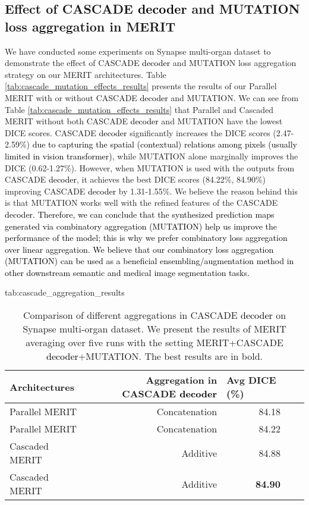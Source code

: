 \documentclass{midl}
\begin{document}
\subsection{Effect of CASCADE \textcolor{black}{decoder} and MUTATION loss aggregation in MERIT}
\label{assec:effect_cascade_mutation}
We have conducted some experiments on Synapse multi-organ dataset to demonstrate the effect of CASCADE \textcolor{black}{decoder} and MUTATION loss aggregation strategy on our MERIT architectures. Table \ref{tab:cascade_mutation_effects_results} presents the results of our Parallel MERIT with or without CASCADE \textcolor{black}{decoder} and MUTATION. We can see from Table \ref{tab:cascade_mutation_effects_results} that Parallel and Cascaded MERIT without both CASCADE \textcolor{black}{decoder} and MUTATION have the lowest DICE scores. CASCADE \textcolor{black}{decoder} significantly increases the DICE scores (2.47-2.59\%) \textcolor{black}{due to capturing the spatial (contextual) relations among pixels (usually limited in vision transformer)}, while MUTATION alone marginally improves the DICE (0.62-1.27\%). However, when MUTATION is used with the outputs from CASCADE \textcolor{black}{decoder}, it achieves the best DICE scores (84.22\%, 84.90\%) improving CASCADE \textcolor{black}{decoder} by 1.31-1.55\%. We believe the reason behind this is that MUTATION works well with the refined features of the CASCADE \textcolor{black}{decoder}. \textcolor{black}{Therefore, we can conclude that the synthesized prediction maps generated via combinatory aggregation (MUTATION) help us improve the performance of the model; this is why we prefer combinatory loss aggregation over linear aggregation. We believe that our combinatory loss aggregation (MUTATION) can be used as a beneficial ensembling/augmentation method in other downstream semantic and medical image segmentation tasks.}

\begin{table*}[t]
\centering
\floatconts
{tab:cascade_aggregation_results}
{\caption{Comparison of different aggregations in CASCADE \textcolor{black}{decoder} on Synapse multi-organ dataset. We present the results of MERIT averaging over five runs with the setting MERIT+CASCADE \textcolor{black}{decoder}+MUTATION. The best results are in bold.}} {{\vspace{-0.4cm} \begin{tabular}{lrrrr}
\toprule
Architectures    &  Aggregation in CASCADE \textcolor{black}{decoder}   &   \multicolumn{1}{l}{Avg DICE (\%)} \\
\midrule
Parallel MERIT            & Concatenation            & 84.18  \\
Parallel MERIT           & Concatenation                            & 84.22   \\
\midrule 
Cascaded MERIT         & Additive                    & 84.88      \\
Cascaded MERIT        & Additive                     & \textbf{84.90}   \\
\bottomrule \end{tabular}}
}\end{table*}
\end{document}
